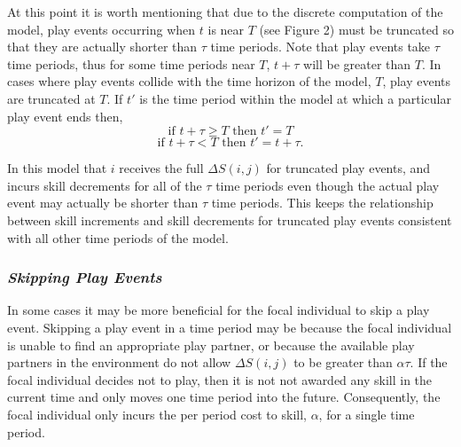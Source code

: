 \documentclass[12pt, letterpaper, fleqn]{article}
\begin{document}
      At this point it is worth mentioning that due to the discrete computation of the model, play events occurring when $t$ is near $T$ (see Figure 2) must be truncated so that they are actually shorter than $\tau$ time periods. %
      Note that play events take $\tau$ time periods, thus for some time periods near $T$, $t+\tau$ will be greater than $T$.
      In cases where play events collide with the time horizon of the model, $T$, play events are truncated at $T$.
      If $t'$ is the time period within the model at which a particular play event ends then,
      \begin{equation*}
      \text{if }t+\tau \ge T\text{ then }t'=T  
      \end{equation*}
      \begin{equation*}
      \text{if }t+\tau < T\text{ then }t'=t+\tau.
      \end{equation*}
	    
    In this model that $i$ receives the full $\Delta S(i,j)$ for truncated play events, and incurs skill decrements for all of the $\tau$ time periods even though the actual play event may actually be shorter than $\tau$ time periods. %
      This keeps the relationship between skill increments and skill decrements for truncated play events consistent with all other time periods of the model. 
    
    \subsubsection*{\it Skipping Play Events}
      \indent In some cases it may be more beneficial for the focal individual to skip a play event.
      Skipping a play event in a time period may be because the focal individual is unable to find an appropriate play partner, or because the available play partners in the environment do not allow $\Delta S(i,j)$ to be greater than $\alpha \tau$. 
      If the focal individual decides not to play, then it is not not awarded any skill in the current time and only moves one time period into the future. 
      Consequently, the focal individual only incurs the per period cost to skill, $\alpha$, for a single time period.
\end{document}
